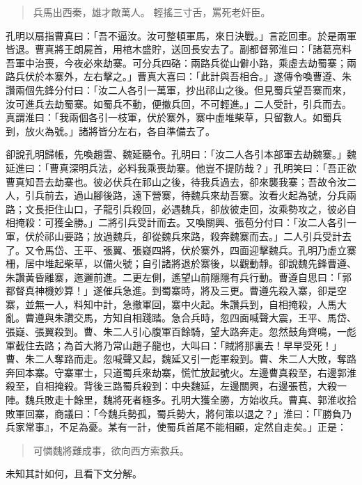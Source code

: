 \begin{quote}
兵馬出西秦，雄才敵萬人。
輕搖三寸舌，罵死老奸臣。
\end{quote}

孔明以扇指曹真曰：「吾不逼汝。汝可整頓軍馬，來日決戰。」言訖回車。於是兩軍皆退。曹真將王朗屍首，用棺木盛貯，送回長安去了。副都督郭淮曰：「諸葛亮料吾軍中治喪，今夜必來劫寨。可分兵四硌：兩路兵從山僻小路，乘虛去劫蜀寨；兩路兵伏於本寨外，左右擊之。」曹真大喜曰：「此計與吾相合。」遂傳令喚曹遵、朱讚兩個先鋒分付曰：「汝二人各引一萬軍，抄出祁山之後。但見蜀兵望吾寨而來，汝可進兵去劫蜀寨。如蜀兵不動，便撤兵回，不可輕進。」二人受計，引兵而去。真謂淮曰：「我兩個各引一枝軍，伏於寨外，寨中虛堆柴草，只留數人。如蜀兵到，放火為號。」諸將皆分左右，各自準備去了。

卻說孔明歸帳，先喚趙雲、魏延聽令。孔明曰：「汝二人各引本部軍去劫魏寨。」魏延進曰：「曹真深明兵法，必料我乘喪劫寨。他豈不提防哉？」孔明笑曰：「吾正欲曹真知吾去劫寨也。彼必伏兵在祁山之後，待我兵過去，卻來襲我寨；吾故令汝二人，引兵前去，過山腳後路，遠下營寨，待魏兵來劫吾寨。汝看火起為號，分兵兩路；文長拒住山口，子龍引兵殺回，必遇魏兵，卻放彼走回，汝乘勢攻之，彼必自相掩殺：可獲全勝。」二將引兵受計而去。又喚關興、張苞分付曰：「汝二人各引一軍，伏於祁山要路；放過魏兵，卻從魏兵來路，殺奔魏寨而去。」二人引兵受計去了。又令馬岱、王平、張翼、張嶷四將，伏於寨外，四面迎擊魏兵。孔明乃虛立寨柵，居中堆起柴草，以備火號；自引諸將退於寨後，以觀動靜。卻說魏先鋒曹遵、朱讚黃昏離寨，迤邐前進。二更左側，遙望山前隱隱有兵行動。曹遵自思曰：「郭都督真神機妙算！」遂催兵急進。到蜀寨時，將及三更。曹遵先殺入寨，卻是空寨，並無一人，料知中計，急撤軍回，寨中火起。朱讚兵到，自相掩殺，人馬大亂。曹遵與朱讚交馬，方知自相踐踏。急合兵時，忽四面喊聲大震，王平、馬岱、張嶷、張翼殺到。曹、朱二人引心腹軍百餘騎，望大路奔走。忽然鼓角齊鳴，一彪軍截住去路；為首大將乃常山趙子龍也，大叫曰：「賊將那裏去！早早受死！」曹、朱二人奪路而走。忽喊聲又起，魏延又引一彪軍殺到。曹、朱二人大敗，奪路奔回本寨。守寨軍士，只道蜀兵來劫寨，慌忙放起號火。左邊曹真殺至，右邊郭淮殺至，自相掩殺。背後三路蜀兵殺到：中央魏延，左邊關興，右邊張苞，大殺一陣。魏兵敗走十餘里，魏將死者極多。孔明大獲全勝，方始收兵。曹真、郭淮收拾敗軍回寨，商議曰：「今魏兵勢孤，蜀兵勢大，將何策以退之？」淮曰：「『勝負乃兵家常事』，不足為憂。某有一計，使蜀兵首尾不能相顧，定然自走矣。」正是：

\begin{quote}
可憐魏將難成事，欲向西方索救兵。
\end{quote}

未知其計如何，且看下文分解。
